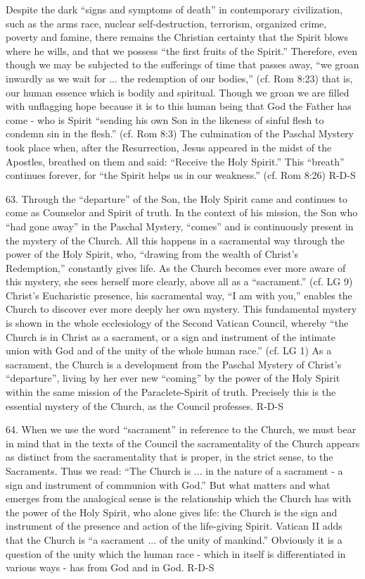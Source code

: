 \documentclass[oneside]{book}
\begin{document}
Despite the dark ``signs and symptoms of death'' in contemporary civilization,
such as the arms race, nuclear self-destruction, terrorism, organized crime,
poverty and famine, there remains the Christian certainty that the Spirit blows
where he wills, and that we possess ``the first fruits of the Spirit.''
Therefore, even though we may be subjected to the sufferings of time that passes
away, ``we groan inwardly as we wait for ... the redemption of our bodies,''
(cf. Rom 8:23) that is, our human essence which is bodily and spiritual. Though
we groan we are filled with unflagging hope because it is to this human being
that God the Father has come - who is Spirit ``sending his own Son in the
likeness of sinful flesh to condemn sin in the flesh.'' (cf. Rom 8:3) The
culmination of the Paschal Mystery took place when, after the Resurrection,
Jesus appeared in the midst of the Apostles, breathed on them and said:
``Receive the Holy Spirit.'' This ``breath'' continues forever, for ``the Spirit
helps us in our weakness.'' (cf. Rom 8:26)
R-D-S

63. Through the ``departure'' of the Son, the Holy Spirit came and continues to
come as Counselor and Spirit of truth. In the context of his mission, the Son
who ``had gone away'' in the Paschal Mystery, ``comes'' and is continuously
present in the mystery of the Church. All this happens in a sacramental way
through the power of the Holy Spirit, who, ``drawing from the wealth of Christ's
Redemption,'' constantly gives life. As the Church becomes ever more aware of
this mystery, she sees herself more clearly, above all as a ``sacrament.''
(cf. LG 9) Christ's Eucharistic presence, his sacramental way, ``I am with
you,'' enables the Church to discover ever more deeply her own mystery. This
fundamental mystery is shown in the whole ecclesiology of the Second Vatican
Council, whereby ``the Church is in Christ as a sacrament, or a sign and
instrument of the intimate union with God and of the unity of the whole human
race.'' (cf. LG 1) As a sacrament, the Church is a development from the Paschal
Mystery of Christ's ``departure'', living by her ever new ``coming'' by the
power of the Holy Spirit within the same mission of the Paraclete-Spirit of
truth. Precisely this is the essential mystery of the Church, as the Council
professes.
R-D-S

64. When we use the word ``sacrament'' in reference to the Church, we must bear
in mind that in the texts of the Council the sacramentality of the Church
appears as distinct from the sacramentality that is proper, in the strict sense,
to the Sacraments. Thus we read: ``The Church is ... in the nature of a
sacrament - a sign and instrument of communion with God.'' But what matters and
what emerges from the analogical sense is the relationship which the Church has
with the power of the Holy Spirit, who alone gives life: the Church is the sign
and instrument of the presence and action of the life-giving Spirit. Vatican II
adds that the Church is ``a sacrament ... of the unity of mankind.'' Obviously
it is a question of the unity which the human race - which in itself is
differentiated in various ways - has from God and in God.
R-D-S
\end{document}
